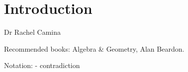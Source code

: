 \tableofcontents

\hypertarget{Introduction}{%
\section*{Introduction}\label{Introduction}}

Dr Rachel Camina

Recommended books: Algebra \& Geometry, Alan Beardon.

Notation: \Lightning - contradiction

\newpage










